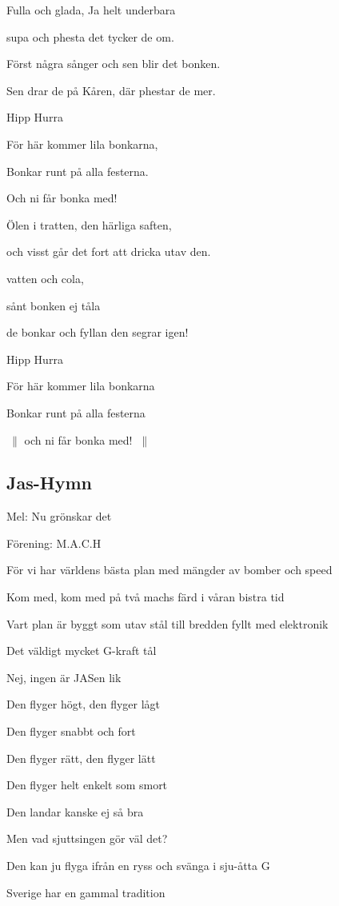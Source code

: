 Fulla och glada, Ja helt underbara

supa och phesta det tycker de om.

Först några sånger och sen blir det bonken.

Sen drar de på Kåren, där phestar de mer.\bigskip

Hipp Hurra

För här kommer lila bonkarna,

Bonkar runt på alla festerna.

Och ni får bonka med!\bigskip

Ölen i tratten, den härliga saften,

och visst går det fort att dricka utav den.

vatten och cola,

sånt bonken ej tåla

de bonkar och fyllan den segrar igen!\bigskip

Hipp Hurra

För här kommer lila bonkarna

Bonkar runt på alla festerna

$\:\|$ och ni får bonka med! $\:\|$\bigskip

\subsection{\textbf{Jas-Hymn}}

Mel: Nu grönskar det

Förening: M.A.C.H


För vi har världens bästa plan med mängder av bomber och speed

Kom med, kom med på två machs färd i våran bistra tid

Vart plan är byggt som utav stål till bredden fyllt med elektronik

Det väldigt mycket G-kraft tål

Nej, ingen är JASen lik\bigskip


Den flyger högt, den flyger lågt

Den flyger snabbt och fort

Den flyger rätt, den flyger lätt

Den flyger helt enkelt som smort

Den landar kanske ej så bra

Men vad sjuttsingen gör väl det?

Den kan ju flyga ifrån en ryss och svänga i sju-åtta G\bigskip

Sverige har en gammal tradition

